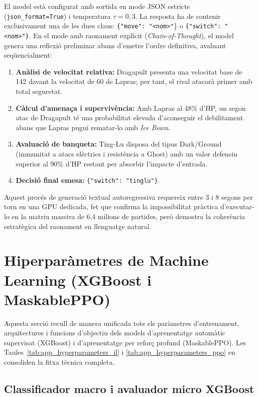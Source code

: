 El model està configurat amb sortida en mode JSON estricte (\texttt{json\_format=True}) i temperatura $\tau = 0{,}3$. La resposta ha de contenir exclusivament una de les dues claus: \texttt{\{"move": "<nom>"}\} o \texttt{\{"switch": "<nom>"\}}. En el mode amb raonament explícit (\textit{Chain-of-Thought}), el model genera una reflexió preliminar abans d'emetre l'ordre definitiva, avaluant seqüencialment:
\begin{enumerate}
    \item \textbf{Anàlisi de velocitat relativa:} Dragapult presenta una velocitat base de 142 davant la velocitat de 60 de Lapras; per tant, el rival atacarà primer amb total seguretat.
    \item \textbf{Càlcul d'amenaça i supervivència:} Amb Lapras al 48\% d'HP, un segon atac de Dragapult té una probabilitat elevada d'aconseguir el debilitament abans que Lapras pugui rematar-lo amb \emph{Ice Beam}.
    \item \textbf{Avaluació de banqueta:} Ting-Lu disposa del tipus Dark/Ground (immunitat a atacs elèctrics i resistència a Ghost) amb un valor defensiu superior al 90\% d'HP restant per absorbir l'impacte d'entrada.
    \item \textbf{Decisió final emesa:} \texttt{\{"switch": "tinglu"\}}.
\end{enumerate}

Aquest procés de generació textual autoregressiva requereix entre $3$ i $8$ segons per torn en una GPU dedicada, fet que confirma la impossibilitat pràctica d'executar-lo en la matriu massiva de 6,4 milions de partides, però demostra la coherència estratègica del raonament en llenguatge natural.

\section{Hiperparàmetres de Machine Learning (XGBoost i MaskablePPO)}
\label{sec:app_ml_hyperparameters}

Aquesta secció recull de manera unificada tots els paràmetres d'entrenament, arquitectures i funcions d'objectiu dels models d'aprenentatge automàtic supervisat (XGBoost) i d'aprenentatge per reforç profund (MaskablePPO). Les Taules~\ref{tab:app_hyperparameters_il} i \ref{tab:app_hyperparameters_ppo} en consoliden la fitxa tècnica completa.

\subsection{Classificador macro i avaluador micro XGBoost}

